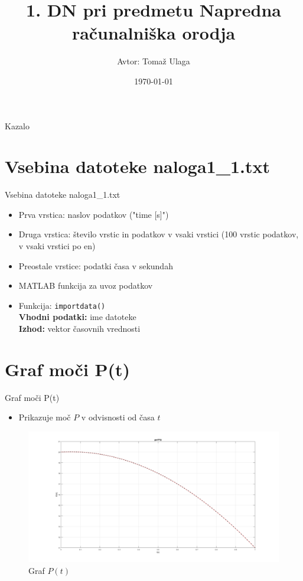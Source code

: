 \documentclass{beamer}
\title{1. DN pri predmetu Napredna računalniška orodja}
\author{Avtor: Tomaž Ulaga}
\date{\today}
\begin{document}
\begin{frame}
    \titlepage
\end{frame}

\begin{frame}{Kazalo}
    \tableofcontents
\end{frame}

\section{Vsebina datoteke naloga1\_1.txt}
\begin{frame}{Vsebina datoteke naloga1\_1.txt}
    \begin{itemize}
        \item Prva vrstica: naslov podatkov ("time [s]")
        \item Druga vrstica: število vrstic in podatkov v vsaki vrstici (100 vrstic podatkov, v vsaki vrstici po en)
        \item Preostale vrstice: podatki časa v sekundah
        \item MATLAB funkcija za uvoz podatkov
            \item Funkcija: \texttt{importdata()} \\
                \textbf{Vhodni podatki:} ime datoteke \\
                 \textbf{Izhod:} vektor časovnih vrednosti
    \end{itemize}
    
\end{frame}

\section{Graf moči P(t)}
\begin{frame}{Graf moči P(t)}
    \begin{itemize}
        \item Prikazuje moč \( P \) v odvisnosti od časa \( t \)
    \end{itemize}
    \begin{figure}
        \includegraphics[width=1.1\textwidth]{graf_P_t_nro_dn1.png}
        \caption{Graf \( P(t) \)}
    \end{figure}
\end{frame}
\end{document}

